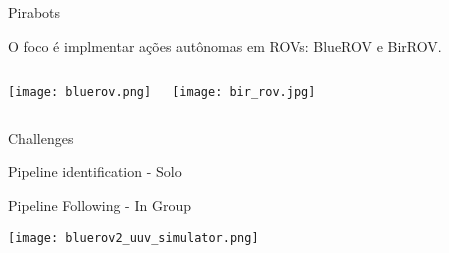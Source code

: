 \begin{frame}[t]{Pirabots}

    
    O foco é implmentar ações autônomas em ROVs: BlueROV e BirROV.

    \begin{columns}
    \begin{center}

        \texttt{[image: bluerov.png]}

    \end{center}

    \vspace*{0.3cm}
    \begin{center}

        \texttt{[image: bir\_rov.jpg]}

    \end{center}

\end{columns}

\end{frame}




\begin{frame}[t]{Challenges}

   
Pipeline identification - Solo

Pipeline Following - In Group
\vspace*{0.1cm}
\begin{center}

    \texttt{[image: bluerov2\_uuv\_simulator.png]}

\end{center}
    
    
            
\end{frame}



